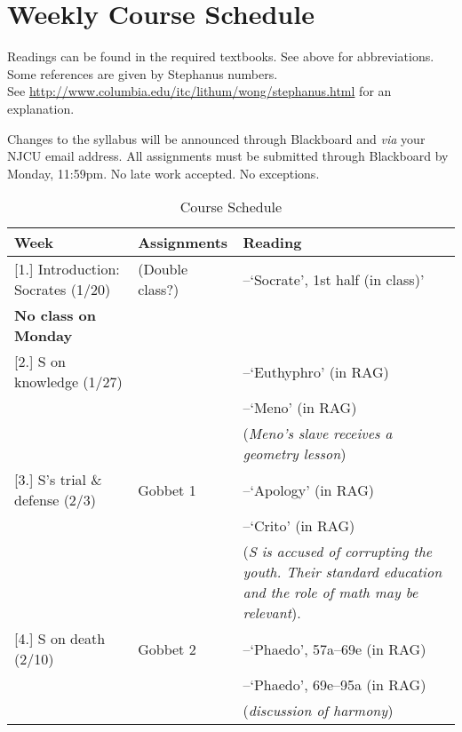 \documentclass[article,oneside]{memoir}
\begin{document}
\section{Weekly Course Schedule}
Readings can be found in the required textbooks. See above for abbreviations. Some references are given by Stephanus numbers.\\ See \href{http://www.columbia.edu/itc/lithum/wong/stephanus.html}{http://www.columbia.edu/itc/lithum/wong/stephanus.html} for an explanation. 

 Changes to the syllabus will be announced through Blackboard and \emph{via} your NJCU email address.  All assignments must be submitted through Blackboard by Monday, 11:59pm. No late work accepted. No exceptions.   \newline

\begin{center}
\begin{longtable}{p{4.5cm}p{2cm}p{6cm}}
 
  \caption{Course Schedule} \\
  \toprule
  \textbf{Week} &\textbf{Assignments} & \textbf{Reading} \\
  \midrule

  

[1.] Introduction: Socrates	(1/20)	&  (Double class?) 	& --`Socrate', 1st half (in class)' \\ 
\textbf{No class on Monday}			&		  			&    \\ [1.8\baselineskip]

[2.] S on knowledge (1/27)			& 				& --`Euthyphro'  (in RAG) \\
			        				&			  	&  --`Meno' (in RAG) \\ 
                                    &				& (\emph{Meno's slave receives a geometry lesson}) \\ [1.8\baselineskip]

[3.] S's trial \& defense (2/3)		& Gobbet 1		& --`Apology' (in RAG) \\
			     				   	& 			    & --`Crito' (in RAG)  \\ 
                                    & 				& (\emph{S is accused of corrupting the youth. Their standard education and the role of math may be relevant}). \\ [1.8\baselineskip]  

[4.] S on death  (2/10)				& Gobbet 2		 & --`Phaedo', 57a--69e (in RAG) \\
									& 			     & --`Phaedo', 69e--95a  (in RAG) \\ 
                                    &				 & (\emph{discussion of harmony}) \\ [1.8\baselineskip]


\end{longtable}
\end{center}
\end{document}
